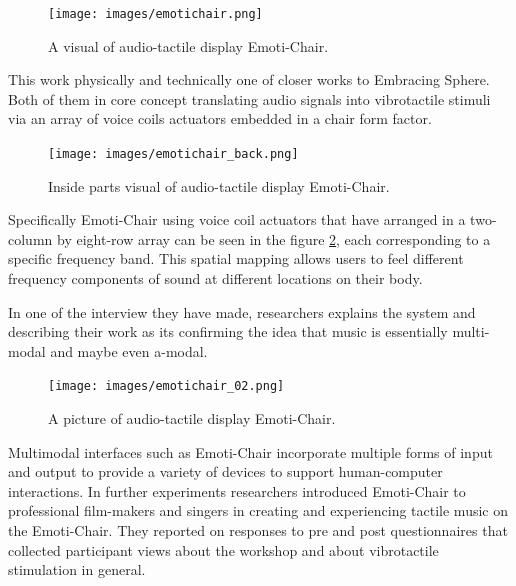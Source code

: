                 \begin{figure}[H]
                    \centering
                    \texttt{[image: images/emotichair.png]}
                    \caption{A visual of audio-tactile display Emoti-Chair.}
                    \label{fig:EMOTICHAIR}
                \end{figure}

                This work physically and technically one of closer works to Embracing Sphere. Both of them in core concept translating audio signals into vibrotactile stimuli via an array of voice coils actuators embedded in a chair form factor.\par

                \begin{figure}[H]
                    \centering
                    \texttt{[image: images/emotichair\_back.png]}
                    \caption{Inside parts visual of audio-tactile display Emoti-Chair.}
                    \label{fig:EMOTICHAIR_BACK}
                \end{figure}

                Specifically Emoti-Chair using voice coil actuators that have arranged in a two-column by eight-row array can be seen in the figure \ref{fig:EMOTICHAIR_BACK}, each corresponding to a specific frequency band. This spatial mapping allows users to feel different frequency components of sound at different locations on their body.\par

                In one of the interview they have made, researchers explains the system and describing their work as its confirming the idea that music is essentially multi-modal and maybe even a-modal.\par

                \begin{figure}[H]
                    \centering
                    \texttt{[image: images/emotichair\_02.png]}
                    \caption{A picture of audio-tactile display Emoti-Chair.}
                    \label{fig:EMOTICHAIR_02}
                \end{figure}                

                Multimodal interfaces such as Emoti-Chair incorporate multiple forms of input and output to provide a variety of devices to support human-computer interactions. In further experiments researchers introduced Emoti-Chair to professional film-makers and singers in creating and experiencing tactile music on the Emoti-Chair\cite{Composing_Vibrotactile_Music}. They reported on responses to pre and post questionnaires that collected participant views about the workshop and about vibrotactile stimulation in general.\par

